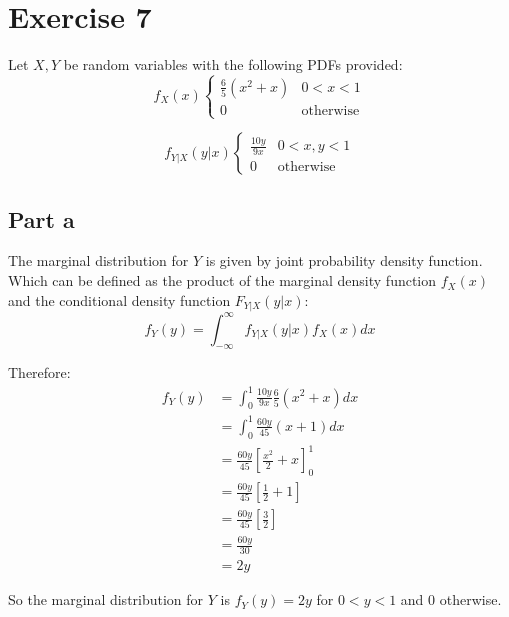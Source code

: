 \section{Exercise 7}
Let $X, Y$ be random variables with the following PDFs provided:
\[
	f_X(x)\begin{cases}
		\frac{6}{5}(x^2+x) & 0 < x < 1        \\
		0                  & \text{otherwise}
	\end{cases}
\]

\[
	f_{Y|X}(y|x)\begin{cases}
		\frac{10y}{9x} & 0 < x,y < 1      \\
		0              & \text{otherwise}
	\end{cases}
\]

\subsection{Part a}

The marginal distribution for $Y$ is given by joint probability density function. Which can be defined as the product of the marginal density function $f_X(x)$ and the conditional density function $F_{Y|X}(y|x)$:
\[
	f_Y(y) = \int_{-\infty}^{\infty}f_{Y|X}(y|x)f_X(x)dx
\]

Therefore:
\begin{align*}
	f_Y(y) & = \int_{0}^{1}\frac{10y}{9x}\frac{6}{5}(x^2+x)dx \\
	       & = \int_{0}^{1}\frac{60y}{45}(x+1)dx              \\
	       & = \frac{60y}{45}\left[\frac{x^2}{2}+x\right]_0^1 \\
	       & = \frac{60y}{45}\left[\frac{1}{2}+1\right]       \\
	       & = \frac{60y}{45}\left[\frac{3}{2}\right]         \\
	       & = \frac{60y}{30}                                 \\
	       & = 2y
\end{align*}

So the marginal distribution for $Y$ is $f_Y(y) = 2y$ for $0 < y < 1$ and $0$ otherwise.
